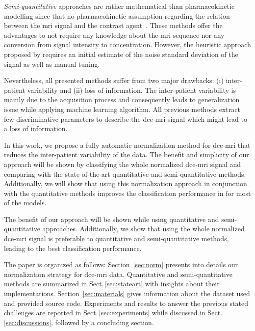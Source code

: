 \emph{Semi-quantitative} approaches are rather mathematical than pharmacokinetic modelling since that no pharmacokinetic assumption regarding the relation between the \ac{mri} signal and the contrast agent~\citep{huisman2001accurate,gliozzi2011phenomenological}.
These methods offer the advantages to not require any knowledge about the \ac{mri} sequence nor any conversion from signal intensity to concentration.
However, the heuristic approach proposed by \citeauthor{huisman2001accurate} requires an initial estimate of the noise standard deviation of the signal as well as manual tuning.

Nevertheless, all presented methods suffer from two major drawbacks:
(i) inter-patient variability and (ii) loss of information.
The inter-patient variability is mainly due to the acquisition process and consequently leads to generalization issue while applying machine learning algorithm.
All previous methods extract few discriminative parameters to describe the \ac{dce}-\ac{mri} signal which might lead to a loss of information.

In this work, we propose a fully automatic normalization method for \ac{dce}-\ac{mri} that reduces the inter-patient variability of the data.
The benefit and simplicity of our approach will be shown by classifying the whole normalized \ac{dce}-\ac{mri} signal and comparing with the state-of-the-art quantitative and semi-quantitative methods.
Additionally, we will show that using this normalization approach in conjunction with the quantitative methods improves the classification performance in for most of the models.

The benefit of our approach will be shown while using quantitative and semi-quantitative approaches.
Additionally, we show that using the whole normalized \ac{dce}-\ac{mri} signal is preferable to quantitative and semi-quantitative methods, leading to the best classification performance.

The paper is organized as follows:
Section~\ref{sec:norm} presents into details our normalization strategy for \ac{dce}-\ac{mri} data.
Quantitative and semi-quantitative methods are summarized in Sect.\,\ref{sec:stateart} with insights about their implementations.
Section~\ref{sec:materials} gives information about the dataset used and provided source code.
Experiments and results to answer the previous stated challenges are reported in Sect.\,\ref{sec:experiments} while discussed in Sect.\,\ref{sec:discussions}, followed by a concluding section.

